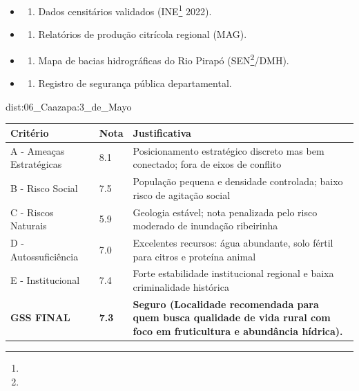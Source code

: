 {\begin{itemize}
\tightlist
\item
  \begin{enumerate}
  \def\labelenumi{\arabic{enumi})}
  \tightlist
  \item
    Dados censitários validados (INE\footnote{\fineINE} 2022).
  \end{enumerate}
\item
  \begin{enumerate}
  \def\labelenumi{\arabic{enumi})}
  \setcounter{enumi}{1}
  \tightlist
  \item
    Relatórios de produção citrícola regional (MAG).
  \end{enumerate}
\item
  \begin{enumerate}
  \def\labelenumi{\arabic{enumi})}
  \setcounter{enumi}{2}
  \tightlist
  \item
    Mapa de bacias hidrográficas do Rio Pirapó (SEN\footnote{\fineSEN}/\allowbreak DMH).
  \end{enumerate}
\item
  \begin{enumerate}
  \def\labelenumi{\arabic{enumi})}
  \setcounter{enumi}{3}
  \tightlist
  \item
    Registro de segurança pública departamental.
  \end{enumerate}
\end{itemize}}{dist:06_Caazapa:3_de_Mayo}
\begin{table}[ht!]
\small \begin{tabular}{p{3.0cm}p{0.8cm}p{6.0cm}} \toprule
\textbf{Critério} & \textbf{Nota} & \textbf{Justificativa} \\ \midrule
A - Ameaças Estratégicas & 8.1 & Posicionamento estratégico discreto mas bem conectado; fora de eixos de conflito \\
B - Risco Social & 7.5 & População pequena e densidade controlada; baixo risco de agitação social \\
C - Riscos Naturais & 5.9 & Geologia estável; nota penalizada pelo risco moderado de inundação ribeirinha \\
D - Autossuficiência & 7.0 & Excelentes recursos: água abundante, solo fértil para citros e proteína animal \\
E - Institucional & 7.4 & Forte estabilidade institucional regional e baixa criminalidade histórica \\
\midrule \textbf{GSS FINAL} & \textbf{7.3} & \textbf{Seguro (Localidade recomendada para quem busca qualidade de vida rural com foco em fruticultura e abundância hídrica).} \\ \bottomrule \end{tabular}
\end{table}
